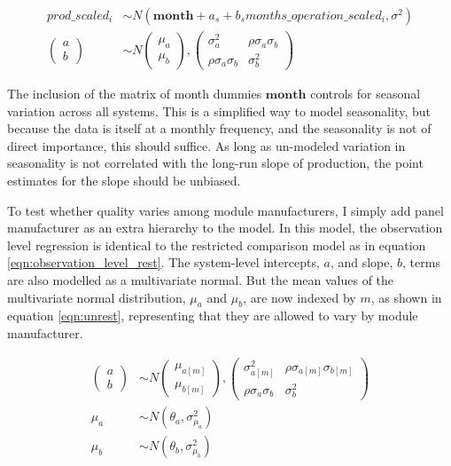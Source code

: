 \documentclass[12pt]{article}
\begin{document}
\begin{equation}
\begin{aligned}
prod\_scaled_{i} &\sim N(\mathbf{month} + a_s + b_s months\_operation\_scaled_{i}, \sigma^2)\\
\begin{pmatrix}
  a\\
  b
\end{pmatrix}
&\sim N
\begin{pmatrix}
  \mu_a\\
  \mu_b
\end{pmatrix},
\begin{pmatrix}
  \sigma_a^2 & \rho \sigma_a \sigma_b \\
  \rho \sigma_a \sigma_b & \sigma_b^2
\end{pmatrix}\label{eqn:observation_level_rest}
\end{aligned}
\end{equation}

The inclusion of the matrix of month dummies $\mathbf{month}$ controls for seasonal variation across all systems. This is a simplified way to model seasonality, but because the data is itself at a monthly frequency, and the seasonality is not of direct importance, this should suffice. As long as un-modeled variation in seasonality is not correlated with the long-run slope of production, the point estimates for the slope should be unbiased.

To test whether quality varies among module manufacturers, I simply add panel manufacturer as an extra hierarchy to the model. In this model, the observation level regression is identical to the restricted comparison model as in equation \ref{eqn:observation_level_rest}. The system-level intercepts, $a$, and slope, $b$, terms are also modelled as a multivariate normal. But the mean values of the multivariate normal distribution, $\mu_a$ and $\mu_b$, are now indexed by $m$, as shown in equation \ref{eqn:unrest}, representing that they are allowed to vary by module manufacturer.

\begin{equation}
\begin{aligned}
\begin{pmatrix}
  a\\
  b
\end{pmatrix}
&\sim N
\begin{pmatrix}
  \mu_{a[m]}\\
  \mu_{b[m]}
\end{pmatrix},
\begin{pmatrix}
  \sigma_{a[m]}^2 & \rho \sigma_{a[m]} \sigma_{b[m]} \\
  \rho \sigma_a \sigma_b & \sigma_b^2
\end{pmatrix} \\
\mu_{a} &\sim N(\theta_a, \sigma_{\mu_a}^2) \\
\mu_{b} & \sim N(\theta_b, \sigma_{\mu_b}^2) \label{eqn:unrest}
\end{aligned}
\end{equation}
\end{document}
